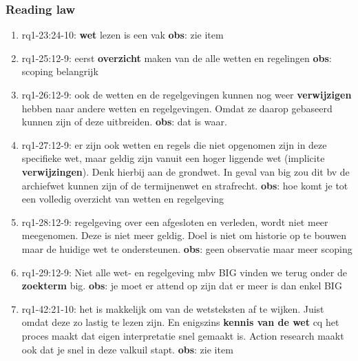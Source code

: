 \subsubsection{Reading law}
\begin{comment}
Hoort dit niet bij rq3?
plaats hier de afgehandelde items.
\end{comment}
\begin{enumerate}
    \item rq1-23:24-10: \textbf{wet} lezen is een vak 
    \newline\textbf{obs}: zie item
    
    \item rq1-25:12-9: eerst \textbf{overzicht} maken van de alle wetten en regelingen
    \newline\textbf{obs}: scoping belangrijk
    
    \item rq1-26:12-9: ook de wetten en de regelgevingen kunnen nog weer \textbf{verwijzigen} hebben naar andere wetten en regelgevingen. Omdat ze daarop gebaseerd kunnen zijn of deze uitbreiden.
    \newline\textbf{obs}: dat is waar.
    
    \item rq1-27:12-9: er zijn ook wetten en regels die niet opgenomen zijn in deze specifieke wet, maar geldig zijn vanuit een hoger liggende wet (implicite \textbf{verwijzingen}). 
    Denk hierbij aan de grondwet. 
    In geval van big zou dit bv de archiefwet kunnen zijn of de termijnenwet en strafrecht.
    \newline\textbf{obs}: hoe komt je tot een volledig overzicht van wetten en regelgeving
    
    \item rq1-28:12-9: regelgeving over een afgesloten en verleden, wordt niet meer meegenomen. 
    Deze is niet meer geldig. 
    Doel is niet om historie op te bouwen maar de huidige wet te ondersteunen.
    \newline\textbf{obs}: geen observatie maar meer scoping
    
    \item rq1-29:12-9: Niet alle wet- en regelgeving mbv BIG vinden we terug onder de \textbf{zoekterm} big.
    \newline\textbf{obs}: je moet er attend op zijn dat er meer is dan enkel BIG
    
    \item rq1-42:21-10: het is makkelijk om van de wetsteksten af te wijken. 
    Juist omdat deze zo lastig te lezen zijn. 
    En enigszins \textbf{kennis van de wet }cq het proces maakt dat eigen interpretatie snel gemaakt is. 
    Action research maakt ook dat je snel in deze valkuil stapt.
    \newline\textbf{obs}: zie item
    

\end{enumerate}
